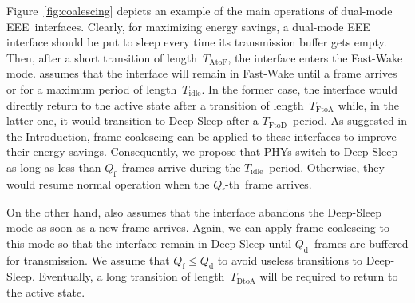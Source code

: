 \documentclass[journal,10pt,letterpaper]{IEEEtran}
\begin{document}
Figure~\ref{fig:coalescing} depicts an example of the main operations
of dual-mode EEE~interfaces. Clearly, for maximizing energy savings, a
dual-mode EEE interface should be put to sleep every time its
transmission buffer gets empty. Then, after a short transition of
length~$T_{\mathrm{AtoF}}$, the interface enters the Fast-Wake
mode. \cite{mostowfi15:dual_mode_eee} assumes that the interface will
remain in Fast-Wake until a frame arrives or for a maximum period of
length~$T_{\mathrm{idle}}$. In the former case, the interface would
directly return to the active state after a transition of
length~$T_{\mathrm{FtoA}}$ while, in the latter one, it would
transition to Deep-Sleep after a $T_{\mathrm{FtoD}}$~period. As
suggested in the Introduction, frame coalescing can be applied to
these interfaces to improve their energy savings. Consequently, we
propose that PHYs switch to Deep-Sleep as long as less than
$Q_{\mathrm{f}}$~frames arrive during the
$T_{\mathrm{idle}}$~period. Otherwise, they would resume normal
operation when the $Q_{\mathrm{f}}$-th~frame arrives.

On the other hand, \cite{mostowfi15:dual_mode_eee} also assumes that
the interface abandons the Deep-Sleep mode as soon as a new frame
arrives. Again, we can apply frame coalescing to this mode so that the
interface remain in Deep-Sleep until $Q_{\mathrm{d}}$~frames are
buffered for transmission. We assume that $Q_{\mathrm{f}} \le
Q_{\mathrm{d}}$ to avoid useless transitions to
Deep-Sleep. Eventually, a long transition of
length~$T_{\mathrm{DtoA}}$ will be required to return to the active
state.
\end{document}
